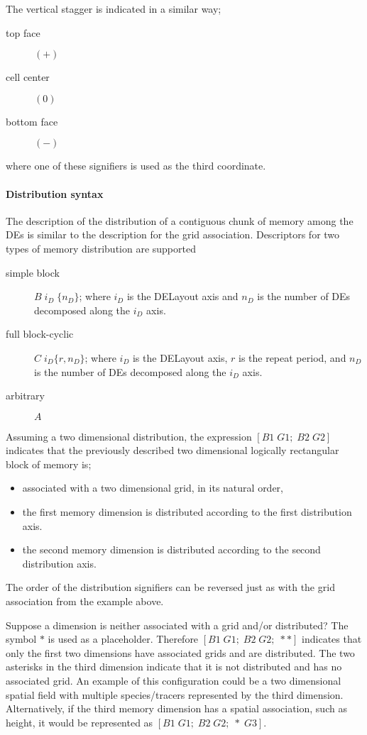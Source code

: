 The vertical stagger is indicated in a similar way;  
\begin{description}
	\item [top face] $(+)$
	\item [cell center] $(0)$
	\item [bottom face] $(-)$
\end{description}
where one of these signifiers is used as the third coordinate.

\paragraph{Distribution syntax}
The description of the distribution of a contiguous chunk of memory among the DEs is similar to the description for the grid association. Descriptors for two types of memory distribution are supported
\begin{description}
	\item[simple block] $B \; i_D \; \{ n_D \} $; where $i_D$ is the DELayout axis and $n_D$ is the number of DEs decomposed along the $i_D$ axis.
	\item[full block-cyclic] $C \; i_D \{ r,n_D \} $; where $i_D$ is the DELayout axis, $r$ is the repeat period, and $n_D$ is the number of DEs decomposed along the $i_D$ axis.
	\item[arbitrary] $A$ 
\end{description}
Assuming a two dimensional distribution, the expression $[ B1 \; G1; \; B2 \; G2 ]$ indicates that the previously described two dimensional logically rectangular block of memory is;
\begin{itemize}
	\item associated with a two dimensional grid, in its natural order,
	\item the first memory dimension is distributed according to the first distribution axis.
	\item the second memory dimension is distributed according to the second distribution axis.

\end{itemize}
The order of the distribution signifiers can be reversed just as with the grid association from the example above. 

Suppose a dimension is neither associated with a grid and/or distributed? The symbol $\ast$ is used as a placeholder. Therefore $[ B1 \; G1; \; B2 \; G2; \; \ast \ast ]$ indicates that only the first two dimensions have associated grids and are distributed. The two asterisks in the third dimension indicate that it is not distributed and has no associated grid. An example of this configuration could be a two dimensional spatial field with multiple species/tracers represented by the third dimension. Alternatively, if the third memory dimension has a spatial association, such as height, it would be represented as $[ B1 \; G1; \; B2 \; G2; \; \ast \; G3 ]$.

